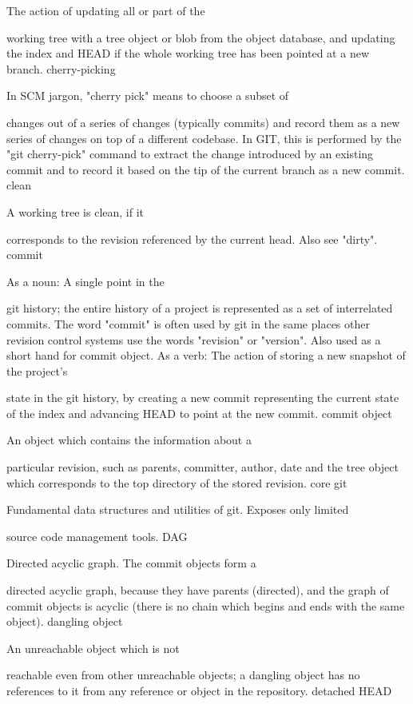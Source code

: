 The action of updating all or part of the

working tree with a tree object
or blob from the
object database, and updating the
index and HEAD if the whole working tree has
been pointed at a new branch.
cherry-picking

In SCM jargon, "cherry pick" means to choose a subset of

changes out of a series of changes (typically commits) and record them
as a new series of changes on top of a different codebase. In GIT, this is
performed by the "git cherry-pick" command to extract the change introduced
by an existing commit and to record it based on the tip
of the current branch as a new commit.
clean

A working tree is clean, if it

corresponds to the revision referenced by the current
head. Also see "dirty".
commit

As a noun: A single point in the

git history; the entire history of a project is represented as a
set of interrelated commits.  The word "commit" is often
used by git in the same places other revision control systems
use the words "revision" or "version".  Also used as a short
hand for commit object.
As a verb: The action of storing a new snapshot of the project's

state in the git history, by creating a new commit representing the current
state of the index and advancing HEAD
to point at the new commit.
commit object

An object which contains the information about a

particular revision, such as parents, committer,
author, date and the tree object which corresponds
to the top directory of the stored
revision.
core git

Fundamental data structures and utilities of git. Exposes only limited

source code management tools.
DAG

Directed acyclic graph. The commit objects form a

directed acyclic graph, because they have parents (directed), and the
graph of commit objects is acyclic (there is no chain
which begins and ends with the same object).
dangling object

An unreachable object which is not

reachable even from other unreachable objects; a
dangling object has no references to it from any
reference or object in the repository.
detached HEAD

